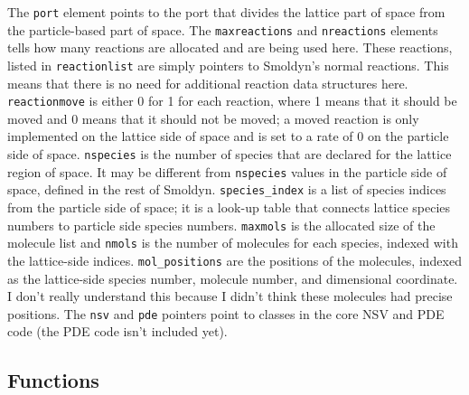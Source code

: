 \documentclass {scrbook}
\newcommand {\ttt} {\texttt}
\begin{document}
The \ttt{port} element points to the port that divides the lattice part of space from the particle-based part of space. The \ttt{maxreactions} and \ttt{nreactions} elements tells how many reactions are allocated and are being used here. These reactions, listed in \ttt{reactionlist} are simply pointers to Smoldyn's normal reactions. This means that there is no need for additional reaction data structures here. \ttt{reactionmove} is either 0 for 1 for each reaction, where 1 means that it should be moved and 0 means that it should not be moved; a moved reaction is only implemented on the lattice side of space and is set to a rate of 0 on the particle side of space. \ttt{nspecies} is the number of species that are declared for the lattice region of space. It may be different from \ttt{nspecies} values in the particle side of space, defined in the rest of Smoldyn. \ttt{species\_index} is a list of species indices from the particle side of space; it is a look-up table that connects lattice species numbers to particle side species numbers. \ttt{maxmols} is the allocated size of the molecule list and \ttt{nmols} is the number of molecules for each species, indexed with the lattice-side indices. \ttt{mol\_positions} are the positions of the molecules, indexed as the lattice-side species number, molecule number, and dimensional coordinate. I don't really understand this because I didn't think these molecules had precise positions. The \ttt{nsv} and \ttt{pde} pointers point to classes in the core NSV and PDE code (the PDE code isn't included yet).

\subsection{Functions}
\end{document}
